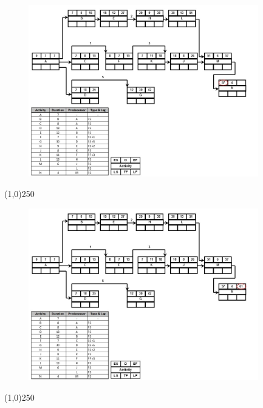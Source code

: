 \begin{frame}
\begin{figure}
	\centering
		\includegraphics[width = 10.0cm]{oldnotes/Slide216.jpg}
\end{figure}
\end{frame}
\begin{center}\line(1,0){250}\end{center}




\begin{frame}
\begin{figure}
	\centering
		\includegraphics[width = 10.0cm]{oldnotes/Slide217.jpg}
\end{figure}
\end{frame}
\begin{center}\line(1,0){250}\end{center}





